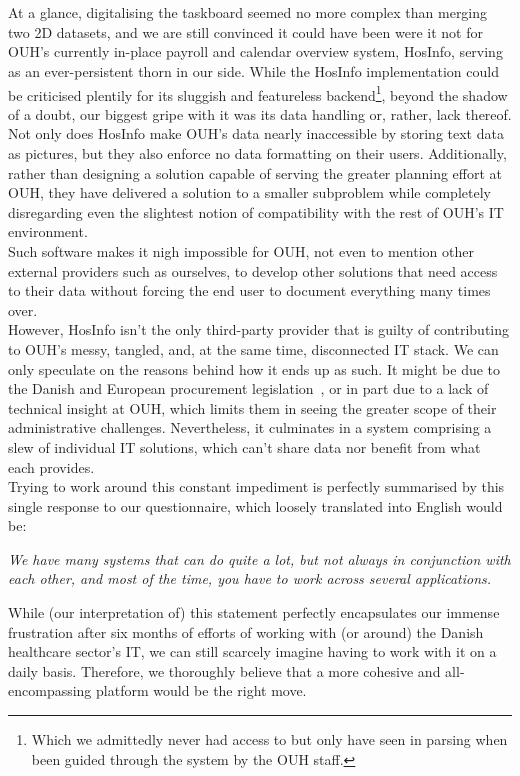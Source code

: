\\
\\
At a glance, digitalising the taskboard seemed no more complex than merging two 2D datasets, and we are still convinced it could have been were it not for OUH's currently in-place payroll and calendar overview system, HosInfo, serving as an ever-persistent thorn in our side. While the HosInfo implementation could be criticised plentily for its sluggish and featureless backend\footnote{Which we admittedly never had access to but only have seen in parsing when been guided through the system by the OUH staff.}, beyond the shadow of a doubt, our biggest gripe with it was its data handling or, rather, lack thereof. Not only does HosInfo make OUH's data nearly inaccessible by storing text data as pictures, but they also enforce no data formatting on their users. Additionally, rather than designing a solution capable of serving the greater planning effort at OUH, they have delivered a solution to a smaller subproblem while completely disregarding even the slightest notion of compatibility with the rest of OUH's IT environment.
\\
Such software makes it nigh impossible for OUH, not even to mention other external providers such as ourselves, to develop other solutions that need access to their data without forcing the end user to document everything many times over.
\\ 
However, HosInfo isn't the only third-party provider that is guilty of contributing to OUH's messy, tangled, and, at the same time, disconnected IT stack. We can only speculate on the reasons behind how it ends up as such. It might be due to the Danish and European procurement legislation~\cite{Udbudsloven, EU-Procurement-Legislation}, or in part due to a lack of technical insight at OUH, which limits them in seeing the greater scope of their administrative challenges. Nevertheless, it culminates in a system comprising a slew of individual IT solutions, which can't share data nor benefit from what each provides.
\\
Trying to work around this constant impediment is perfectly summarised by this single response to our questionnaire, which loosely translated into English would be:
\begin{center}
 \textit{We have many systems that can do quite a lot, but not always in conjunction with each other, and most of the time, you have to work across several applications.}
\end{center}
While (our interpretation of) this statement perfectly encapsulates our immense frustration after six months of efforts of working with (or around) the Danish healthcare sector's IT, we can still scarcely imagine having to work with it on a daily basis. Therefore, we thoroughly believe that a more cohesive and all-encompassing platform would be the right move.
